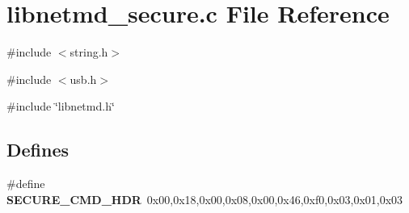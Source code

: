 \section{libnetmd\_\-secure.c File Reference}
\label{libnetmd__secure_8c}
{\ttfamily \#include $<$string.h$>$}\par
{\ttfamily \#include $<$usb.h$>$}\par
{\ttfamily \#include \char`\"{}libnetmd.h\char`\"{}}\par
\subsection*{Defines}
\begin{DoxyCompactItemize}
\item 
\#define {\bf SECURE\_\-CMD\_\-HDR}~0x00,0x18,0x00,0x08,0x00,0x46,0xf0,0x03,0x01,0x03
\end{DoxyCompactItemize}
